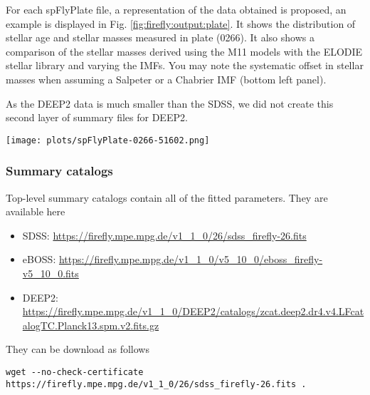 \documentclass[onecolumn]{aa}
\begin{document}
For each spFlyPlate file, a representation of the data obtained is proposed, an example is displayed in 
Fig. \ref{fig:firefly:output:plate}. 
It shows the distribution of stellar age and stellar masses measured in plate (0266). It also shows a comparison of the stellar masses derived using the M11 models with the ELODIE stellar library and varying the IMFs. You may note the systematic offset in stellar masses when assuming a Salpeter or a Chabrier IMF (bottom left panel). 

As the DEEP2 data is much smaller than the SDSS, we did not create this second layer of summary files for DEEP2. 

\begin{figure*}
\begin{center}
\caption{\label{fig:firefly:output:plate}
Summary plot for SDSS plate 0266. 
It shows the cumulative normed distributions of stellar ages and stellar masses derived for all IMF + library setups (top row).
The bottom panels compare the stellar masses derived assuming different IMFs. 
It shows the known fact that the assumption of a Salpeter IMF implies stellar masses that are on average 30\% larger than those for Kroupa and Chabrier IMFs (bottom left panel).
Chabrier and Kroupa IMFs give on average the same stellar masses (bottom right panel).}
\texttt{[image: plots/spFlyPlate-0266-51602.png]}
\end{center}
\end{figure*}

\subsubsection{Summary catalogs}
Top-level summary catalogs contain all of the fitted parameters. They are available here 
\begin{itemize}
\item SDSS: \url{https://firefly.mpe.mpg.de/v1_1_0/26/sdss_firefly-26.fits}
\item eBOSS: \url{https://firefly.mpe.mpg.de/v1_1_0/v5_10_0/eboss_firefly-v5_10_0.fits}
\item DEEP2: \url{https://firefly.mpe.mpg.de/v1_1_0/DEEP2/catalogs/zcat.deep2.dr4.v4.LFcatalogTC.Planck13.spm.v2.fits.gz}
\end{itemize}
They can be download as follows
\begin{verbatim}
wget --no-check-certificate https://firefly.mpe.mpg.de/v1_1_0/26/sdss_firefly-26.fits .
\end{verbatim}
\end{document}
